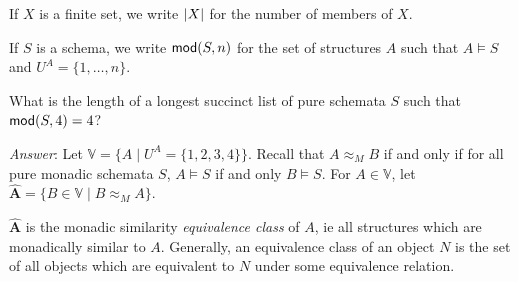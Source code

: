 \begin{definition}
If $X$ is a finite set, we write $\mbox{$|X|$}$ for the number of members of $X$.

If $S$ is a schema, we write $\mbox{$\mathsf {mod}(S,n)$}$ for the set of structures $A$ such that $A\models S$ and $U^A=\{1,\ldots, n\}.$
\end{definition}
\begin{question}\label{mspec-q}
What is the length of a longest succinct list of pure schemata $S$ such that $\mbox{$\mathsf {mod}(S,4)$}=4$?
\end{question}

\emph{Answer}:
Let $\mathbb{V} = \{A\mid U^A=\{1,2,3,4\}\}$. Recall that $A\approx_M B$ if and only if for all pure monadic schemata $S$, $A\models S$ if and only $B\models S$. For $A\in \mathbb{V}$, let $\bm\hat{A}=\{B\in \mathbb{V}\mid B\approx_M A\}$.

\begin{aside}
    $\bm\hat{A}$ is the monadic similarity \emph{equivalence class} of $A$, ie all structures which are monadically similar to $A$. Generally, an equivalence class of an object $N$ is the set of all objects which are equivalent to $N$ under some equivalence relation. 
\end{aside}

